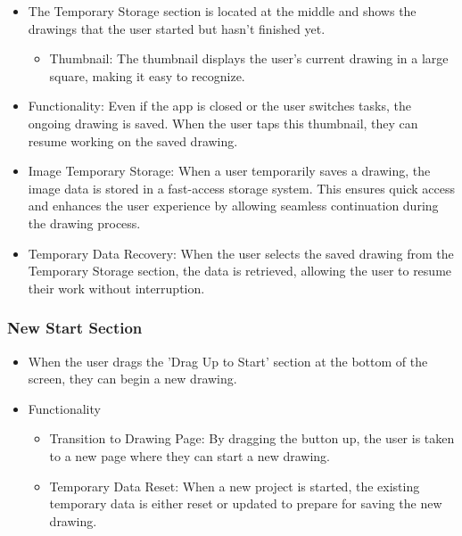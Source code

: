\documentclass[conference]{IEEEtran}
\begin{document}
\begin{itemize}
    \item The Temporary Storage section is located at the middle and shows the drawings that the user started but hasn't finished yet.
\begin{itemize}
    \item Thumbnail: The thumbnail displays the user’s current drawing in a large square, making it easy to recognize.\\
\end{itemize}
    \item Functionality: Even if the app is closed or the user switches tasks, the ongoing drawing is saved. When the user taps this thumbnail, they can resume working on the saved drawing.\\
    \item Image Temporary Storage: When a user temporarily saves a drawing, the image data is stored in a fast-access storage system. This ensures quick access and enhances the user experience by allowing seamless continuation during the drawing process.\\
    \item Temporary Data Recovery: When the user selects the saved drawing from the Temporary Storage section, the data is retrieved, allowing the user to resume their work without interruption.\\

\end{itemize}

\subsubsection{New Start Section}

\begin{itemize}
    \item When the user drags the 'Drag Up to Start' section at the bottom of the screen, they can begin a new drawing.\\
    \item Functionality 
\begin{itemize}
    \item Transition to Drawing Page: By dragging the button up, the user is taken to a new page where they can start a new drawing.\\
    \item Temporary Data Reset: When a new project is started, the existing temporary data is either reset or updated to prepare for saving the new drawing.\\

\end{itemize}
\end{itemize}    
\end{document}
